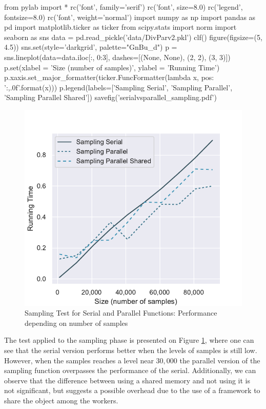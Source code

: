 \documentclass[11pt]{article}
\begin{document}
\begin{pycode}
from pylab import *
rc('font', family='serif')
rc('font', size=8.0)
rc('legend', fontsize=8.0)
rc('font', weight='normal')
import numpy as np
import pandas as pd
import matplotlib.ticker as ticker
from scipy.stats import norm
import seaborn as sns
data = pd.read_pickle('data/DivParv2.pkl')
clf()
figure(figsize=(5, 4.5))
sns.set(style='darkgrid', palette="GnBu_d")
p = sns.lineplot(data=data.iloc[:, 0:3], dashes=[(None, None), (2, 2), (3, 3)])
p.set(xlabel = 'Size (number of samples)', ylabel = 'Running Time')
p.xaxis.set_major_formatter(ticker.FuncFormatter(lambda x, pos: '{:,.0f}'.format(x)))
p.legend(labels=['Sampling Serial', 'Sampling Parallel', 'Sampling Parallel Shared'])
savefig('serialvsparallel_sampling.pdf')
\end{pycode}

\begin{figure}[H]
    \begin{center}
        \includegraphics{serialvsparallel_sampling.pdf}
    \end{center}
    \caption{Sampling Test for Serial and Parallel Functions: Performance depending on number of samples}\label{fig:SamplingTest}
\end{figure}

The test applied to the sampling phase is presented on Figure \ref{fig:SamplingTest}, where one can see that the serial
version performs better when the levels of samples is still low. However, when the samples reaches a level near $30,000$
the parallel version of the sampling function overpasses the performance of the serial. Additionally, we can observe
that the difference between using a shared memory and not using it is not significant, but suggests a possible overhead
due to the use of a framework to share the object among the workers.
\end{document}
